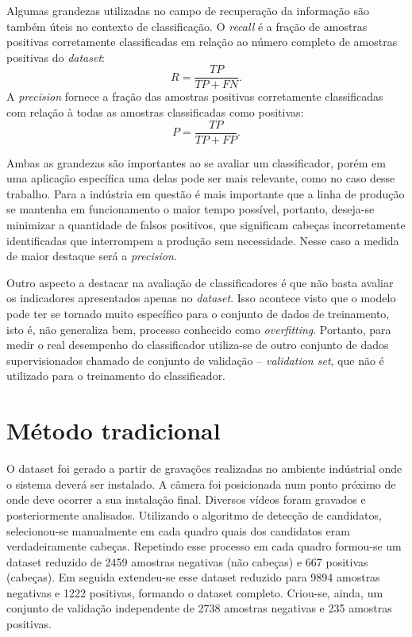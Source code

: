 Algumas grandezas utilizadas no campo de recuperação da informação \cite{inforetrival} são também úteis no contexto de classificação. O \textit{recall} é a fração de amostras positivas corretamente classificadas em relação ao número completo de amostras positivas do \textit{dataset}:
\begin{equation}
R = \frac{TP}{TP+FN}.
\end{equation}
A \textit{precision} fornece a fração das amostras positivas corretamente classificadas com relação à todas as amostras classificadas como positivas:
\begin{equation}
P = \frac{TP}{TP+FP}.
\end{equation}

Ambas as grandezas são importantes ao se avaliar um classificador, porém em uma aplicação específica uma delas pode ser mais relevante, como no caso desse trabalho. Para a indústria em questão é mais importante que a linha de produção se mantenha em funcionamento o maior tempo possível, portanto, deseja-se minimizar a quantidade de falsos positivos, que significam cabeças incorretamente identificadas que interrompem a produção sem necessidade. Nesse caso a medida de maior destaque será a \textit{precision}.

Outro aspecto a destacar na avaliação de classificadores é que não basta avaliar os indicadores apresentados apenas no \textit{dataset}. Isso acontece visto que o modelo pode ter se tornado muito específico para o conjunto de dados de treinamento, isto é, não generaliza bem, processo conhecido como \textit{overfitting}. Portanto, para medir o real desempenho do classificador utiliza-se de outro conjunto de dados supervisionados chamado de conjunto de validação -- \textit{validation set}, que não é utilizado para o treinamento do classificador.

\section{Método tradicional}
O dataset foi gerado a partir de gravações realizadas no ambiente indústrial onde o sistema deverá ser instalado. A câmera foi posicionada num ponto próximo de onde deve ocorrer a sua instalação final. Diversos vídeos foram gravados e posteriormente analisados. Utilizando o algoritmo de detecção de candidatos, selecionou-se manualmente em cada quadro quais dos candidatos eram verdadeiramente cabeças. Repetindo esse processo em cada quadro formou-se um dataset reduzido de 2459 amostras negativas (não cabeças) e 667 positivas (cabeças). Em seguida extendeu-se esse dataset reduzido para 9894 amostras negativas e 1222 positivas, formando o dataset completo. Criou-se, ainda, um conjunto de validação independente de 2738 amostras negativas e 235 amostras positivas.

